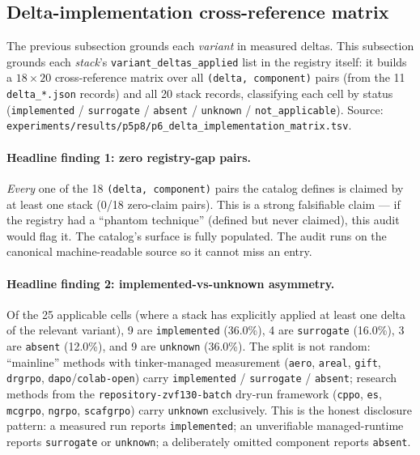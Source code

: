\documentclass{article}
\begin{document}
\subsection{Delta-implementation cross-reference matrix}
\label{sec:p6-delta-implementation-matrix}

The previous subsection grounds each \emph{variant} in measured deltas.
This subsection grounds each \emph{stack}'s \texttt{variant\_deltas\_applied}
list in the registry itself: it builds a $18 \times 20$ cross-reference
matrix over all \texttt{(delta, component)} pairs (from the 11
\texttt{delta\_*.json} records) and all 20 stack records, classifying
each cell by status (\texttt{implemented} / \texttt{surrogate} /
\texttt{absent} / \texttt{unknown} / \texttt{not\_applicable}). Source:
\texttt{experiments/results/p5p8/p6\_delta\_implementation\_matrix.tsv}.

\paragraph{Headline finding 1: zero registry-gap pairs.}
\emph{Every} one of the 18 \texttt{(delta, component)} pairs the
catalog defines is claimed by at least one stack (0/18 zero-claim
pairs). This is a strong falsifiable claim --- if the registry had a
``phantom technique'' (defined but never claimed), this audit would
flag it. The catalog's surface is fully populated. The audit runs
on the canonical machine-readable source so it cannot miss an entry.

\paragraph{Headline finding 2: implemented-vs-unknown asymmetry.}
Of the 25 applicable cells (where a stack has explicitly applied at
least one delta of the relevant variant), 9 are \texttt{implemented}
(36.0\%), 4 are \texttt{surrogate} (16.0\%), 3 are \texttt{absent}
(12.0\%), and 9 are \texttt{unknown} (36.0\%). The split is not
random: ``mainline'' methods with tinker-managed measurement
(\texttt{aero}, \texttt{areal}, \texttt{gift}, \texttt{drgrpo},
\texttt{dapo}/\texttt{colab-open}) carry \texttt{implemented} /
\texttt{surrogate} / \texttt{absent}; research methods from the
\texttt{repository-zvf130-batch} dry-run framework
(\texttt{cppo}, \texttt{es}, \texttt{mcgrpo}, \texttt{ngrpo},
\texttt{scafgrpo}) carry \texttt{unknown} exclusively. This is the
honest disclosure pattern: a measured run reports
\texttt{implemented}; an unverifiable managed-runtime reports
\texttt{surrogate} or \texttt{unknown}; a deliberately omitted
component reports \texttt{absent}.
\end{document}
